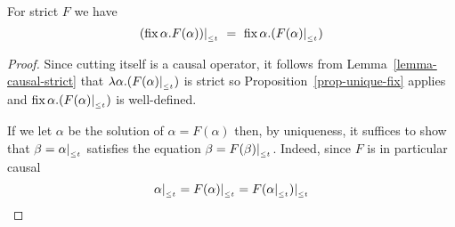 \begin{corollary}
\label{cor-fix-cut}
For strict $F$ we have
$$
(\mbox{fix}\,\alpha.F(\alpha))|_{_{\leq t}} ~=~  \mbox{fix}\,\alpha.(F(\alpha)|_{_{\leq t}})
$$
\end{corollary}
\begin{proof}
Since cutting itself is a causal operator, it follows from Lemma~\ref{lemma-causal-strict} that $\lambda\alpha.(F(\alpha)|_{_{\leq t}})$ is strict
so Proposition~\ref{prop-unique-fix} applies and $\mbox{fix}\,\alpha.(F(\alpha)|_{_{\leq t}})$
is well-defined.

If we let $\alpha$ be the solution of $\alpha=F(\alpha)$ then, by uniqueness, it suffices to show that $\beta=\alpha|_{_{\leq t}}$ satisfies
the equation $\beta=F(\beta)|_{_{\leq t}}$. Indeed, since $F$ is in particular causal
$$
\alpha|_{_{\leq t}} = F(\alpha)|_{_{\leq t}} = F(\alpha|_{_{\leq t}})|_{_{\leq t}}
$$


\qquad
\end{proof}

